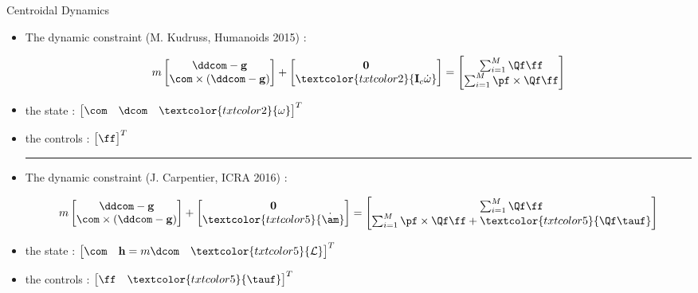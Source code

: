 \begin{frame}{Centroidal Dynamics}

\begin{itemize}

\item The dynamic constraint \textcolor{txtcolor2}{(M. Kudruss, Humanoids 2015)} :
\begin{scriptsize}
\begin{align*}
  m
  \begin{bmatrix}
  \ddcom - {\bf g} \\
  \com \times (\ddcom - {\bf g})
  \end{bmatrix}
  +
  \begin{bmatrix}
   {\bf 0} \\
     \textcolor{txtcolor2}{{\bf I}_c \dot{\omega}}
  \end{bmatrix}
  =
  \begin{bmatrix}
  \sum_{i=1}^{M}
  \Qf \ff \\
  \sum_{i=1}^{M}
  \pf \times \Qf  \ff
  \end{bmatrix}
\end{align*}
\end{scriptsize}
\item the state :
$
\begin{bmatrix}
\com & \dcom & \textcolor{txtcolor2}{\omega}
\end{bmatrix}^T
$
\item the controls :
$
\begin{bmatrix}
\ff
\end{bmatrix}^T
$

\textcolor{txtcolor1}{\hrule}
\vspace*{0.5cm}

\item The dynamic constraint \textcolor{txtcolor5}{(J. Carpentier, ICRA 2016)} :
\begin{scriptsize}
\begin{align*}
  m
  \begin{bmatrix}
  \ddcom - {\bf g} \\
  \com \times (\ddcom - {\bf g})
  \end{bmatrix}
  +
  \begin{bmatrix}
   {\bf 0} \\
   \textcolor{txtcolor5}{ \dot{\bf \am} }
  \end{bmatrix}
  =
  \begin{bmatrix}
  \sum_{i=1}^{M}
  \Qf \ff \\
  \sum_{i=1}^{M}
  \pf \times \Qf  \ff +
  \textcolor{txtcolor5}{ \Qf \tauf}
  \end{bmatrix}
\end{align*}
\end{scriptsize}
\item the state :
$
\begin{bmatrix}
\com & {\bf h}=m\dcom & \textcolor{txtcolor5}{\mathcal{L}}
\end{bmatrix}^T
$
\item the controls :
$
\begin{bmatrix}
\ff & \textcolor{txtcolor5}{\tauf}
\end{bmatrix}^T
$


\end{itemize}
\end{frame}
